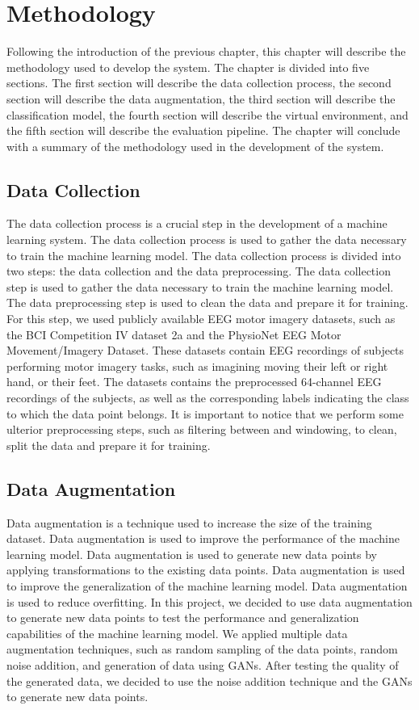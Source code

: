 \chapter{Methodology}\label{ch:methodology}
Following the introduction of the previous chapter, this chapter will describe the methodology used to develop the system.
The chapter is divided into five sections.
The first section will describe the data collection process, the second section will describe the data augmentation, the third section will describe the classification model, the fourth section will describe the virtual environment, and the fifth section will describe the evaluation pipeline.
The chapter will conclude with a summary of the methodology used in the development of the system.

\section{Data Collection}
The data collection process is a crucial step in the development of a machine learning system.
The data collection process is used to gather the data necessary to train the machine learning model.
The data collection process is divided into two steps: the data collection and the data preprocessing.
The data collection step is used to gather the data necessary to train the machine learning model.
The data preprocessing step is used to clean the data and prepare it for training.
For this step, we used publicly available EEG motor imagery datasets, such as the BCI Competition IV dataset 2a and the PhysioNet EEG Motor Movement/Imagery Dataset.
These datasets contain EEG recordings of subjects performing motor imagery tasks, such as imagining moving their left or right hand, or their feet.
The datasets contains the preprocessed 64-channel EEG recordings of the subjects, as well as the corresponding labels indicating the class to which the data point belongs.
It is important to notice that we perform some ulterior preprocessing steps, such as filtering between and windowing, to clean, split the data and prepare it for training.

\section{Data Augmentation}
Data augmentation is a technique used to increase the size of the training dataset.
Data augmentation is used to improve the performance of the machine learning model.
Data augmentation is used to generate new data points by applying transformations to the existing data points.
Data augmentation is used to improve the generalization of the machine learning model.
Data augmentation is used to reduce overfitting.
In this project, we decided to use data augmentation to generate new data points to test the performance and generalization capabilities of the machine learning model.
We applied multiple data augmentation techniques, such as random sampling of the data points, random noise addition, and generation of data using GANs.
After testing the quality of the generated data, we decided to use the noise addition technique and the GANs to generate new data points.

